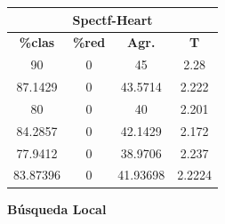 \documentclass[11pt,a4paper]{article}
\theoremstyle{definition}
\begin{document}
\begin{tabbing}
{		\begin{tabular}{|c|c|c|c|}
			\hline
			\multicolumn{4}{|c|}{\textbf{Spectf-Heart}} \\ \hline
			\textbf{\%clas} & \textbf{\%red} & \textbf{Agr.} & \textbf{T} \\ \hline 
			90	      &0	&45	      &2.28\\ \hline
87.1429	  &0	&43.5714	  &2.222\\ \hline
80	      &0	&40	      &2.201\\ \hline
84.2857	  &0	&42.1429	  &2.172 \\ \hline
77.9412	  &0	&38.9706	  &2.237 \\ \hline
83.87396	&0	&41.93698	&2.2224\\ \hline

		\end{tabular}
		}
	\end{tabbing}
	
	\textbf{Búsqueda Local}
	
\end{document}
